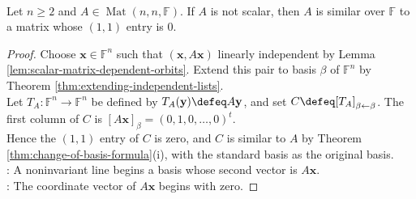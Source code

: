 \begin{lemma} \label{lem:nonscalar-similar-zero-entry} \\
Let $n\geq2$ and $A\in\operatorname{Mat}(n,n,\mathbb{F})$. If $A$ is not scalar, then $A$ is similar over $\mathbb{F}$ to a matrix whose $(1,1)$ entry is $0$.
\begin{proof}
Choose $\mathbf{x}\in\mathbb{F}^n$ such that $(\mathbf{x},A\mathbf{x})$ linearly independent by Lemma \ref{lem:scalar-matrix-dependent-orbits}. Extend this pair to basis $\beta$ of $\mathbb{F}^n$ by Theorem \ref{thm:extending-independent-lists}.\\
Let $T_A:\mathbb{F}^n\to\mathbb{F}^n$ be defined by $T_A(\mathbf{y})\defeq A\mathbf{y}$, and set $C\defeq[T_A]_{\beta\leftarrow\beta}$. The first column of $C$ is $[A\mathbf{x}]_{\beta}=(0,1,0,\ldots,0)^t$.\\
Hence the $(1,1)$ entry of $C$ is zero, and $C$ is similar to $A$ by Theorem \ref{thm:change-of-basis-formula}(i), with the standard basis as the original basis.\\
: A noninvariant line begins a basis whose second vector is $A\mathbf{x}$.\\
: The coordinate vector of $A\mathbf{x}$ begins with zero.
\end{proof}
\end{lemma}

